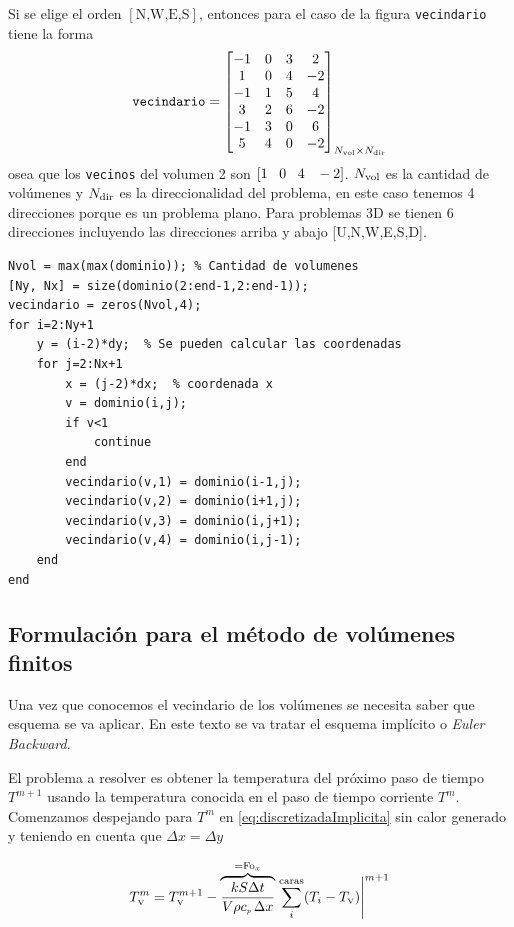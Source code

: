 \documentclass[11pt, titlepage]{article}
\begin{document}
Si se elige el orden $[\text{N,W,E,S}]$, entonces para el caso de la figura \texttt{vecindario} tiene la forma 
\begin{equation}
    \texttt{vecindario} =  \begin{bmatrix}
        -1 & 0 & 3 & 2 \\
        1 & 0 & 4 & -2 \\
        -1 & 1 & 5  &4   \\
        3 & 2 & 6 &-2  \\
        -1 & 3 & 0 & 6 \\
        5  & 4  & 0 & -2
    \end{bmatrix}_{N_{\text{vol}}\times N_{\text{dir}}}
\end{equation}
osea que los \texttt{vecinos} del volumen 2 son $[1\;\;\; 0\;\;\; 4\;\;\;-2]$. $N_{\text{vol}}$ es la cantidad de volúmenes y $N_{\text{dir}}$ es la direccionalidad del problema, en este caso tenemos 4 direcciones porque es un problema plano. Para problemas 3D se tienen 6 direcciones incluyendo las direcciones arriba y abajo [U,N,W,E,S,D].
\clearpage
\begin{lstlisting}[caption = {Armado de la matriz \texttt{vecindario} a partir de la matriz \texttt{dominio}}]
Nvol = max(max(dominio)); % Cantidad de volumenes
[Ny, Nx] = size(dominio(2:end-1,2:end-1));
vecindario = zeros(Nvol,4);
for i=2:Ny+1
	y = (i-2)*dy;  % Se pueden calcular las coordenadas
	for j=2:Nx+1
		x = (j-2)*dx;  % coordenada x
		v = dominio(i,j); 
		if v<1
			continue
		end
		vecindario(v,1) = dominio(i-1,j);
		vecindario(v,2) = dominio(i+1,j);
		vecindario(v,3) = dominio(i,j+1);
		vecindario(v,4) = dominio(i,j-1);
	end
end
\end{lstlisting}

\subsection{Formulación para el método de volúmenes finitos}
Una vez que conocemos el vecindario de los volúmenes se necesita saber que esquema se va aplicar. En este texto se va tratar el esquema implícito o \textit{Euler Backward}.

El problema a resolver es obtener la temperatura del próximo paso de tiempo $T^{m+1}$ usando la temperatura conocida en el paso de tiempo corriente $T^{m}$. Comenzamos despejando para $T^m$ en \eqref{eq:discretizadaImplicita} sin calor generado y teniendo en cuenta que $\Delta x = \Delta y$

\begin{equation} \label{eq:volfin1}
    T_{\text{\tiny V}}^m =T_{\text{\tiny V}}^{m+1} - \overbrace{\frac{k S \Delta t}{V \rho {c_{\textit{\tiny p}}}\,\Delta x} }^{={\mathrm{Fo}}_x}\left.\sum_i^{\text{caras}}(T_i-T_{\text{\tiny V}})\right|^{m+1}
\end{equation}
\end{document}
